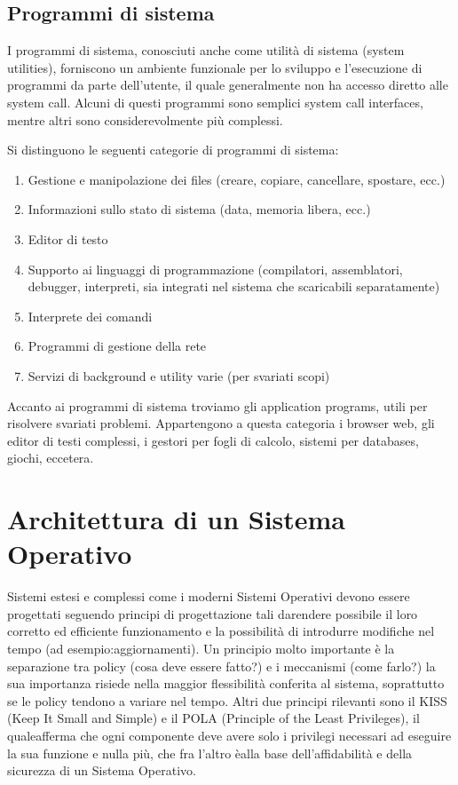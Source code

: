 \documentclass[a4paper]{article}
\begin{document}
\subsection{Programmi di sistema}
I programmi di sistema, conosciuti anche come utilità di sistema (system utilities), forniscono un ambiente funzionale per lo sviluppo e l'esecuzione di programmi da parte dell'utente, il quale generalmente non ha accesso diretto alle system call. Alcuni di questi programmi sono semplici system call interfaces, mentre altri sono considerevolmente più complessi.

Si distinguono le seguenti categorie di programmi di sistema:
\begin{enumerate}
   \item Gestione e manipolazione dei files (creare, copiare, cancellare, spostare, ecc.)
   \item Informazioni sullo stato di sistema (data, memoria libera, ecc.)
   \item Editor di testo
   \item Supporto ai linguaggi di programmazione (compilatori, assemblatori, debugger, interpreti, sia integrati nel sistema che scaricabili separatamente)
   \item Interprete dei comandi
   \item Programmi di gestione della rete
   \item Servizi di background e utility varie (per svariati scopi)
\end{enumerate}

Accanto ai programmi di sistema troviamo gli application programs, utili per risolvere svariati problemi. Appartengono a questa categoria i browser web, gli editor di testi complessi, i gestori per fogli di calcolo, sistemi per databases, giochi, eccetera.

\newpage
\section{Architettura di un Sistema Operativo}
Sistemi estesi e complessi come i moderni Sistemi Operativi devono essere progettati seguendo principi di progettazione tali darendere possibile il loro corretto ed efficiente funzionamento e la possibilità di introdurre modifiche nel tempo (ad esempio:aggiornamenti). Un principio molto importante è la separazione tra policy (cosa deve essere fatto?) e i meccanismi (come farlo?) la sua importanza risiede nella maggior flessibilità conferita al sistema, soprattutto se le policy tendono a variare nel tempo.
Altri due principi rilevanti sono il KISS (Keep It Small and Simple) e il POLA (Principle of the Least Privileges), il qualeafferma che ogni componente deve avere solo i privilegi necessari ad eseguire la sua funzione e nulla più, che fra l'altro èalla base dell'affidabilità e della sicurezza di un Sistema Operativo.
\end{document}
